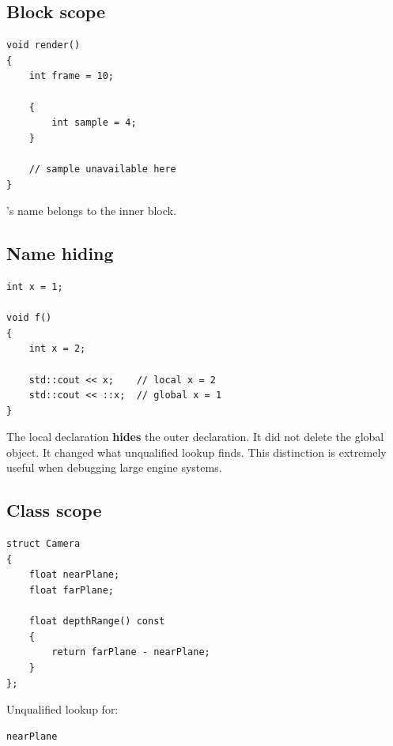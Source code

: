 \subsection{Block scope}\label{05-engine-i-ch002-block-scope}

\hypertarget{05-engine-i-ch002-block-scope}{}

\begin{verbatim}
void render()
{
    int frame = 10;

    {
        int sample = 4;
    }

    // sample unavailable here
}
\end{verbatim}

's name belongs to the inner block.

\subsection{Name hiding}\label{05-engine-i-ch002-name-hiding}

\hypertarget{05-engine-i-ch002-name-hiding}{}

\begin{verbatim}
int x = 1;

void f()
{
    int x = 2;

    std::cout << x;    // local x = 2
    std::cout << ::x;  // global x = 1
}
\end{verbatim}

The local declaration \textbf{hides} the outer declaration. It did not delete the global object. It changed what unqualified lookup finds. This distinction is extremely useful when debugging large engine systems.

\subsection{Class scope}\label{05-engine-i-ch002-class-scope}

\hypertarget{05-engine-i-ch002-class-scope}{}

\begin{verbatim}
struct Camera
{
    float nearPlane;
    float farPlane;

    float depthRange() const
    {
        return farPlane - nearPlane;
    }
};
\end{verbatim}

Unqualified lookup for:

\begin{verbatim}
nearPlane
\end{verbatim}

